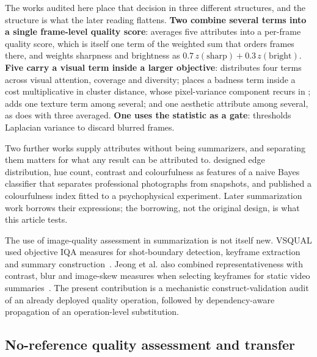 The works audited here place that decision in three different structures, and the structure
is what the later reading flattens. \textbf{Two combine several terms into a single frame-level quality score}:
\citet{srinivas2016rank} averages five attributes into a per-frame quality score, which is
itself one term of the weighted sum that orders frames there, and
\citet{korolkov2025keyframe} weights sharpness and brightness as
$0.7\,z(\mathrm{sharp})+0.3\,z(\mathrm{bright})$. \textbf{Five carry a visual term inside a
larger objective}: \citet{qaroush2025diversity} distributes four terms across visual
attention, coverage and diversity; \citet{jeong2016static} places a badness term inside a cost multiplicative in cluster
distance, whose pixel-variance component recurs in \citet{xu2024property}; \citet{yang2024keyframe} adds one texture term among
several; and \citet{huang2024aesthetic} one aesthetic attribute among several, as
\citet{gygli2014summe} does with three averaged. \textbf{One uses the statistic as a gate}:
\citet{cakmak2025tripss} thresholds Laplacian variance to discard blurred frames.

Two further works supply attributes without being summarizers, and separating them matters
for what any result can be attributed to. \citet{ke2006highlevel} designed edge distribution,
hue count, contrast and colourfulness as features of a naive Bayes classifier that separates
professional photographs from snapshots, and \citet{hasler2003colorfulness} published a
colourfulness index fitted to a psychophysical experiment. Later summarization work borrows
their expressions; the borrowing, not the original design, is what this article tests.

The use of image-quality assessment in summarization is not itself new.
VSQUAL used objective IQA measures for shot-boundary detection, keyframe
extraction and summary construction~\citep{cirne2014vsqual}. Jeong et al. also
combined representativeness with contrast, blur and image-skew measures when
selecting keyframes for static video summaries~\citep{jeong2016static}. The present contribution is a mechanistic construct-validation audit of an already deployed
quality operation,
followed by dependency-aware propagation of an operation-level substitution.

\subsection{No-reference quality assessment and transfer}

